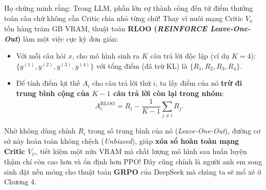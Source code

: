 Họ chứng minh rằng: Trong LLM, phần lớn sự thành công đến từ điểm thưởng toàn câu chứ không cần Critic chia nhỏ từng chữ! Thay vì nuôi mạng Critic $V_\psi$ tốn hàng trăm GB VRAM, thuật toán \textbf{RLOO (\textit{REINFORCE Leave-One-Out})} làm một việc cực kỳ đơn giản:
\begin{itemize}[leftmargin=1.2cm]
    \item Với mỗi câu hỏi $x$, cho mô hình sinh ra $K$ câu trả lời độc lập (ví dụ $K = 4$): $\{y^{(1)}, y^{(2)}, y^{(3)}, y^{(4)}\}$ với tổng điểm (đã trừ KL) là $\{R_1, R_2, R_3, R_4\}$.
    \item Để tính điểm lợi thế $A_i$ cho câu trả lời thứ $i$, ta lấy điểm của nó \textbf{trừ đi trung bình cộng của $K-1$ câu trả lời còn lại trong nhóm}:
    \begin{equation}
        A_i^{\text{RLOO}} = R_i - \frac{1}{K - 1} \sum_{j \neq i} R_j.
        \label{eq:rloo_eng}
    \end{equation}
\end{itemize}
Nhờ không dùng chính $R_i$ trong số trung bình của nó (\textit{Leave-One-Out}), đường cơ sở này hoàn toàn không chệch (\textit{Unbiased}), giúp \textbf{xóa sổ hoàn toàn mạng Critic $V_\psi$}, tiết kiệm một nửa VRAM mà chất lượng mô hình sau huấn luyện thậm chí còn cao hơn và ổn định hơn PPO! Đây cũng chính là người anh em song sinh đặt nền móng cho thuật toán \textbf{GRPO} của DeepSeek mà chúng ta sẽ mổ xẻ ở Chương 4.
